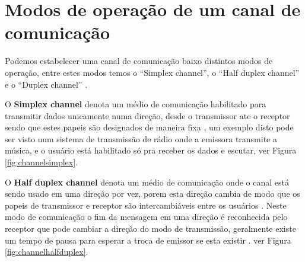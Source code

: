 \documentclass[a4paper,10pt]{article}
\begin{document}
\section{Modos de operação de um canal de comunicação}

Podemos estabelecer uma canal de comunicação baixo distintos modos de operação, 
entre estes modos temos o ``Simplex channel'', o ``Half duplex channel'' e o 
``Duplex channel'' \cite[pp.60 ]{hura2001data}\cite[pp. 5]{shinde2009computer}.

O \textbf{Simplex channel} denota um médio de comunicação habilitado 
para transmitir dados unicamente numa direção, desde o transmissor ate o receptor 
sendo que estes papeis são designados de maneira fixa 
\cite[pp. 5]{shinde2009computer} \cite[pp. 430]{sawaya2002dicionario} \cite[pp.60 ]{hura2001data}, 
um exemplo disto pode ser visto num sistema de transmissão de rádio onde a emissora 
transmite a música, e o usuário está habilitado só pra receber os dados e escutar, 
ver Figura \ref{fig:channelsimplex}. 

O \textbf{Half duplex channel} denota um médio de comunicação onde o canal está
sendo usado em uma direção por vez, 
porem esta direção cambia de modo que os papeis de transmissor e receptor são 
intercambiáveis entre os usuários 
\cite[pp. 5]{shinde2009computer}\cite[pp. 208]{sawaya2002dicionario}. 
Neste modo de comunicação o fim da mensagem em uma direção é 
reconhecida pelo receptor que pode cambiar a direção do modo de transmissão,
geralmente existe um tempo de pausa para esperar a troca de emissor se esta existir \cite[pp. 60]{hura2001data}.
ver Figura \ref{fig:channelhalfduplex}. 
\end{document}
